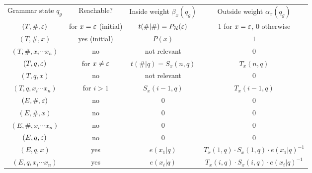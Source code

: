 \newcommand\mystrut{\rule[-0.6em]{0pt}{1.8em}}%
\newcommand\mute{\color{black!30}}
\begin{center}\begin{tabular}{|c|c||c|c|}%
 \hline\mystrut
 Grammar state $q_g$ & Reachable? & Inside weight $\beta_x(q_g)$ & Outside weight $\alpha_x(q_g)$
 \\\hhline{|=|=#=|=|}\mystrut
 $(T,\#,\varepsilon)$ & for $x=\varepsilon$ (initial) & $t(\#|\#) = P_\mathcal H(\varepsilon)$ & 1 for $x=\varepsilon$, 0 otherwise
 \\\hline\mystrut
 $(T,\#,x)$ & yes (initial) & $P(x)$ & $1$
 \\\hline\mystrut
 \mute$(T,\#,x_i\cdots x_n)$ & \mute no & \mute not relevant & \mute0
 \\\hline\mystrut
 $(T,q,\varepsilon)$ & for $x\neq\varepsilon$ & $t(\#|q)=S_x(n,q)$ & $T_x(n,q)$
 \\\hline\mystrut
 \mute$(T,q,x)$ & \mute no & \mute not relevant & \mute0
 \\\hline\mystrut
 $(T,q,x_i\cdots x_n)$ & for $i>1$ & $S_x(i-1,q)$ & $T_x(i-1,q)$
 \\\hhline{|=|=#=|=|}\mystrut
 \mute$(E,\#,\varepsilon)$ & \mute no & \mute0 & \mute0
 \\\hline\mystrut
 \mute$(E,\#,x)$ & \mute no & \mute0 & \mute0
 \\\hline\mystrut
 \mute$(E,\#,x_i\cdots x_n)$ & \mute no & \mute0 & \mute0
 \\\hline\mystrut
 \mute$(E,q,\varepsilon)$ & \mute no & \mute0 & \mute0
 \\\hline\mystrut
 $(E,q,x)$ & yes & $e(x_1|q)$ & $T_x(1,q) \cdot S_x(1,q) \cdot e(x_1|q)^{-1}$
 \\\hline\mystrut
 $(E,q,x_i\cdots x_n)$ & yes & $e(x_i|q)$ & $T_x(i,q) \cdot S_x(i,q) \cdot e(x_i|q)^{-1}$
 \\\hline
\end{tabular}\end{center}

\endinput
\clearpage
Let $c$ be an $V^*$-corpus. For all $q,q'\in Q$ and $v\in V$, the complete-data
corpus is defined by
\begin{align*}
 c\!\dangle{\omega,\mu_\uh}\mbig\kla{\#,(\#,T)} &= c(\eps), \\
 c\!\dangle{\omega,\mu_\uh}\mbig\kla{q,(\#,T)} &= \sum_{x\in\operatorname{supp}(h)\setminus\brc\eps} c(x) \cdot R_x(1,q), \\
 c\!\dangle{\omega,\mu_\uh}\mbig\kla{\#,(q,T)} &= \sum_{x\in\operatorname{supp}(h)\setminus\brc\eps} c(x) \cdot R_x\mbig\kla{\abs x,q}, \\
 c\!\dangle{\omega,\mu_\uh}\mbig\kla{q',(q,T)} &= \sum_{x\in\operatorname{supp}(h)\setminus\brc\eps} c(x) \cdot \sum_{i\in\brc{1,\ldots,\abs x-1}} U_x(i,q,q'), \\
 c\!\dangle{\omega,\mu_\uh}\mbig\kla{v,(q,E)} &= \sum_{x\in\operatorname{supp}(h)\setminus\brc\eps} c(x) \cdot \sum_{i\in\brc{1,\ldots,\abs x}: x_i=v} R_x(i,q), \\
\end{align*}
